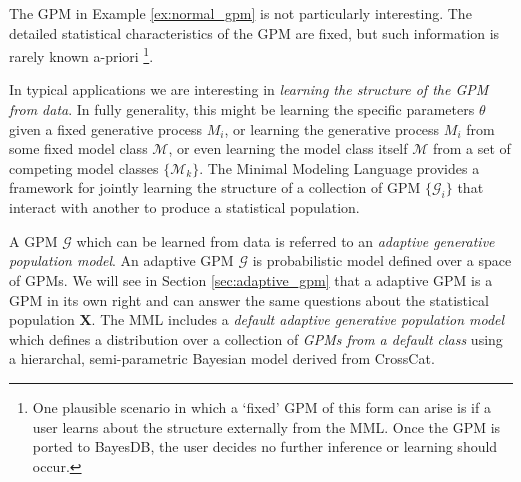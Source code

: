 \documentclass[10pt,letterpaper]{article}
\newcommand{\set}[1]{\{#1\}}
\begin{document}
The GPM in Example \ref{ex:normal_gpm} is not particularly interesting. The
detailed statistical characteristics of the GPM are fixed, but such information
is rarely known a-priori
\footnote{One plausible
scenario in which a `fixed' GPM of this form can arise is if a user learns about
the structure externally from the MML. Once the GPM is ported to BayesDB, the
user decides no further inference or learning should occur.}.

In typical applications we are interesting in \textit{learning the structure of
the GPM from data}. In fully generality, this might be learning the specific
parameters $\theta$ given a fixed generative process $M_i$, or learning the
generative process $M_i$ from some fixed model class $\mathcal{M}$, or even
learning the model class itself $\mathcal{M}$ from a set of competing model
classes $\set{\mathcal{M}_k}$. The Minimal Modeling Language provides a
framework for jointly learning the structure of a collection of GPM
$\set{\mathcal{G}_i}$ that interact with another to produce a statistical
population.

A GPM $\mathcal{G}$ which can be learned from data is referred to an
\textit{adaptive generative population model}. An adaptive GPM $\mathcal{G}$ is
probabilistic model defined over a space of GPMs. We will see in Section
\ref{sec:adaptive_gpm} that a adaptive GPM is a GPM in its own right and can
answer the same questions about the statistical population $\mathbf{X}$. The MML
includes a
\textit{default adaptive generative population model} which defines a
distribution over a collection of
\textit{GPMs from a default class} using a hierarchal, semi-parametric Bayesian
model derived from CrossCat.
\end{document}
